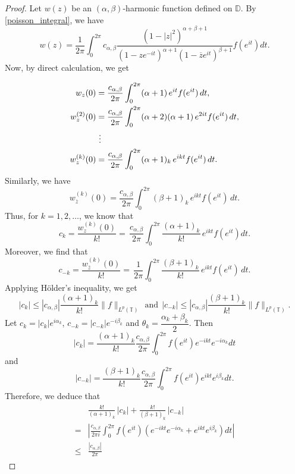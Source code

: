 \documentclass[10pt,a4paper]{amsart}
\newcommand{\ID}{{\mathbb D}}
\begin{document}
\begin{proof}
	Let $w(z)$ be an $(\alpha,\beta)$-harmonic function defined on $\ID$. By \eqref{poisson_integral},
    we have
	\begin{equation}\label{47}
			w(z) = \frac{1}{2\pi} \int_0^{2\pi} c_{\alpha,\beta} \frac{\left(1 - |z|^2\right)^{\alpha + \beta + 1}}{(1 - z e^{-it})^{\alpha+1} (1 - \overline{z} e^{it})^{\beta+1}} f\left(e^{it}\right)dt.
	\end{equation}
	Now, by direct calculation, we get
	
	\begin{align*}
		w_{z}(0)
		&= \frac{c_{\alpha,\beta}}{2\pi}\int_{0}^{2\pi} (\alpha+1)\,e^{it} f(e^{it})\,dt,\\
		w_{ z}^{(2)}(0)
		&= \frac{c_{\alpha,\beta}}{2\pi}\int_{0}^{2\pi} (\alpha+2)(\alpha+1)\,e^{2it} f(e^{it})\,dt,\\ 
		&\ \vdots \notag\\
		w_{ z}^{(k)}(0)
		&= \frac{c_{\alpha,\beta}}{2\pi}\int_{0}^{2\pi} (\alpha+1)_{k}\, e^{ikt} f(e^{it})\,dt.
		\end{align*}
	Similarly, we have
	$$w_{ \overline{z}}^{(k)}(0)
	= \frac{c_{\alpha,\beta}}{2\pi}\int_{0}^{2\pi} (\beta+1)_{k}\, e^{ikt} f(e^{it})\,dt.
	$$
Thus, for \(k=1,2,\ldots\), we know that 
	$$
	c_k
	= \frac{w_z^{(k)}(0)}{k!}
	= \,
	\frac{c_{\alpha,\beta}}{2\pi}\int_{0}^{2\pi} \frac{(\alpha+1)_{k}}{k!}\,e^{ikt} f\left(e^{it}\right)dt.
	$$
	Moreover, we find that
	$$
	c_{-k}
	= \frac{w_{\bar z}^{(k)}(0)}{k!}
	= \,
	\frac{1}{2\pi}\int_{0}^{2\pi} \frac{(\beta+1)_{k}}{k!}\,e^{ikt} f\left(e^{it}\right)\,dt.
	$$
	Applying H\"older's inequality, we get
	$$|c_k|\leq |c_{\alpha,\beta}|\frac{(\alpha+1)_{k}}{k!}\|f\|_{L^p(\mathbb{T})}\ \ \text{and}\ \ |c_{-k}|\leq|c_{\alpha,\beta}|\frac{(\beta+1)_{k}}{k!}\|f\|_{L^p(\mathbb{T})}.$$
Let $c_k=|c_k|e^{i\alpha_k}$, $c_{-k}=|c_{-k}|e^{-i\beta_k}$ and $\theta_k=\dfrac{\alpha_k+\beta_k}{2}$. Then 
$$
|c_k|=\frac{(\alpha+1)_{k}}{ k!}\frac{c_{\alpha,\beta}}{2\pi}
\int_{0}^{2\pi}
f\left(e^{it}\right)e^{-ikt}e^{-i\alpha_k}dt$$ and
$$
|c_{-k}|=\frac{(\beta+1)_{k}}{ k!}
\frac{c_{\alpha,\beta}}{2\pi}\int_{0}^{2\pi}
f\left(e^{it}\right)e^{ikt}e^{i\beta_k}dt.
$$
Therefore, we deduce that
\begin{align*}
\begin{split}
	&\frac{ k!}{(\alpha+1)_{k}}\,|c_k|+ \frac{k!}{(\beta+1)_{k}}\,|c_{-k}|
	\\=&\left|
	\frac{c_{\alpha,\beta}}{2\pi i}\int_{0}^{2\pi}f\left(e^{it}\right) \left(e^{-ikt}e^{-i\alpha_k}+e^{ikt}e^{i\beta_k}\right)dt\right|\\ \leq&\frac{|c_{\alpha,\beta}|}{2\pi}

\end{split}
\end{align*}
\end{proof}
\end{document}
